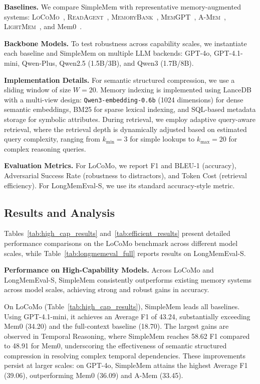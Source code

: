 \documentclass{article}
\newcommand{\ours}{SimpleMem}
\theoremstyle{plain}
\theoremstyle{definition}
\theoremstyle{remark}
\begin{document}
\noindent \textbf{Baselines.} We compare \ours{} with representative memory-augmented systems: \textsc{LoCoMo}~\cite{maharana2024eval}, \textsc{ReadAgent}~\cite{readagent}, \textsc{MemoryBank}~\cite{memorybank}, \textsc{MemGPT}~\cite{Packer2023MemGPTTL}, \textsc{A-Mem}~\cite{Xu2025AMEMAM}, \textsc{LightMem}~\cite{fang2025lightmem}, and Mem0~\cite{mem0}.

\noindent \textbf{Backbone Models.} To test robustness across capability scales, we instantiate each baseline and \ours{} on multiple LLM backends:  GPT-4o, GPT-4.1-mini, Qwen-Plus, Qwen2.5 (1.5B/3B), and Qwen3 (1.7B/8B).


\noindent \textbf{Implementation Details.}
For semantic structured compression, we use a sliding window of size $W=20$.
Memory indexing is implemented using LanceDB with a multi-view design: \texttt{Qwen3-embedding-0.6b} (1024 dimensions) for dense semantic embeddings, BM25 for sparse lexical indexing, and SQL-based metadata storage for symbolic attributes. During retrieval, we employ adaptive query-aware retrieval, where the retrieval depth is dynamically adjusted based on estimated query complexity, ranging from $k_{\min}=3$ for simple lookups to $k_{\max}=20$ for complex reasoning queries.


\noindent \textbf{Evaluation Metrics.} For LoCoMo, we report F1 and BLEU-1 (accuracy), Adversarial Success Rate (robustness to distractors), and Token Cost (retrieval efficiency). For LongMemEval-S, we use its standard accuracy-style metric.

\subsection{Results and Analysis}
\label{sec:results}
Tables~\ref{tab:high_cap_results} and~\ref{tab:efficient_results} present detailed performance comparisons on the LoCoMo benchmark across different model scales, while Table~\ref{tab:longmemeval_full} reports results on LongMemEval-S.

\noindent \textbf{Performance on High-Capability Models.}
Across LoCoMo and LongMemEval-S, \ours{} consistently outperforms existing memory systems across model scales, achieving strong and robust gains in accuracy.

On LoCoMo (Table~\ref{tab:high_cap_results}), \ours{} leads all baselines. Using GPT-4.1-mini, it achieves an Average F1 of 43.24, substantially exceeding Mem0 (34.20) and the full-context baseline (18.70). The largest gains are observed in Temporal Reasoning, where \ours{} reaches 58.62 F1 compared to 48.91 for Mem0, underscoring the effectiveness of semantic structured compression in resolving complex temporal dependencies. These improvements persist at larger scales: on GPT-4o, \ours{} attains the highest Average F1 (39.06), outperforming Mem0 (36.09) and A-Mem (33.45).
\end{document}
